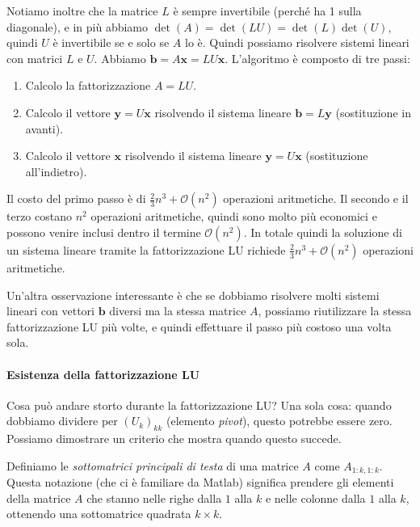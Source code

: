 \documentclass[a4paper]{report}
\theoremstyle{definiton}
\theoremstyle{remark}
\newcommand{\x}{\mathbf{x}}
\renewcommand{\b}{\mathbf{b}}
\begin{document}
Notiamo inoltre che la matrice $L$ è sempre invertibile (perché ha 1 sulla diagonale), e in più abbiamo $\det(A) = \det(LU) = \det(L) \det(U)$, quindi $U$ è invertibile se e solo se $A$ lo è. Quindi possiamo risolvere sistemi lineari con matrici $L$ e $U$. Abbiamo $\b = A\x = LU\x$.
L'algoritmo è composto di tre passi:
\begin{enumerate}
    \item Calcolo la fattorizzazione $A=LU$.
    \item Calcolo il vettore $\mathbf{y}=U\x$ risolvendo il sistema lineare $\b=L\mathbf{y}$ (sostituzione in avanti).
    \item Calcolo il vettore $\x$ risolvendo il sistema lineare $\mathbf{y}=U\x$ (sostituzione all'indietro).
\end{enumerate}
Il costo del primo passo è di $\frac23 n^3 + \mathcal{O}(n^2)$ operazioni aritmetiche. Il secondo e il terzo costano $n^2$ operazioni aritmetiche, quindi sono molto più economici e possono venire inclusi dentro il termine $\mathcal{O}(n^2)$. In totale quindi la soluzione di un sistema lineare tramite la fattorizzazione LU richiede $\frac23 n^3 + \mathcal{O}(n^2)$ operazioni aritmetiche.

Un'altra osservazione interessante è che se dobbiamo risolvere molti sistemi lineari con vettori $\b$ diversi ma la stessa matrice $A$, possiamo riutilizzare la stessa fattorizzazione LU più volte, e quindi effettuare il passo più costoso una volta sola.

\paragraph{Esistenza della fattorizzazione LU}

Cosa può andare storto durante la fattorizzazione LU? Una sola cosa: quando dobbiamo dividere per $(U_k)_{kk}$ (elemento \emph{pivot}), questo potrebbe essere zero. Possiamo dimostrare un criterio che mostra quando questo succede.

Definiamo le \emph{sottomatrici principali di testa} di una matrice $A$ come $A_{1:k,1:k}$. Questa notazione (che ci è familiare da Matlab) significa prendere gli elementi della matrice $A$ che stanno nelle righe dalla $1$ alla $k$ e nelle colonne dalla $1$ alla $k$, ottenendo una sottomatrice quadrata $k\times k$.
\end{document}

